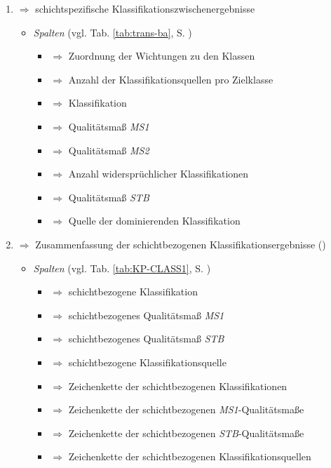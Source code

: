 \begin{enumerate}
\item {} $\Rightarrow$ schichtspezifische Klassifikationszwischenergebnisse 

\begin{itemize}
\item \textit{Spalten} (vgl. Tab. \ref{tab:trans-ba}, S. \pageref{tab:trans-ba})
\begin{itemize}
\item {} $\Rightarrow$ Zuordnung der Wichtungen zu den Klassen
\item {} $\Rightarrow$ Anzahl der Klassifikationsquellen pro Zielklasse 
\item {} $\Rightarrow$  Klassifikation
\item {} $\Rightarrow$ Qualitätsmaß \textit{MS1}
\item {} $\Rightarrow$ Qualitätsmaß \textit{MS2}
\item {} $\Rightarrow$ Anzahl widersprüchlicher Klassifikationen 
\item {} $\Rightarrow$ Qualitätsmaß \textit{STB}
\item {} $\Rightarrow$ Quelle der dominierenden Klassifikation 
\end{itemize}
\end{itemize}
\item 
{} $\Rightarrow$ Zusammenfassung der schichtbezogenen Klassifikationsergebnisse () 
\begin{itemize}
\item \textit{Spalten} (vgl. Tab. \ref{tab:KP-CLASS1}, S. \pageref{tab:KP-CLASS1})
\begin{itemize}
\item {} $\Rightarrow$  schichtbezogene Klassifikation
\item {} $\Rightarrow$ schichtbezogenes Qualitätsmaß \textit{MS1}
\item {} $\Rightarrow$ schichtbezogenes Qualitätsmaß \textit{STB}
\item {} $\Rightarrow$ schichtbezogene Klassifikationsquelle
\item {} $\Rightarrow$ Zeichenkette der schichtbezogenen Klassifikationen
\item {} $\Rightarrow$ Zeichenkette der schichtbezogenen \textit{MS1}-Qualitätsmaße
\item {} $\Rightarrow$ Zeichenkette der schichtbezogenen \textit{STB}-Qualitätsmaße
\item {} $\Rightarrow$ Zeichenkette der schichtbezogenen Klassifikationsquellen 
\end{itemize}
\end{itemize}
\end{enumerate}







